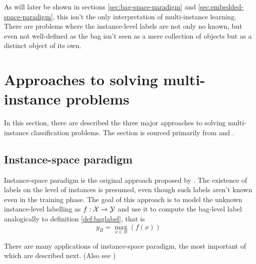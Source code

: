 As will later be shown in sections \ref{sec:bag-space-paradigm} and \ref{sec:embedded-space-paradigm}, this isn't the only interpretation of multi-instance learning. There are problems where the instance-level labels are not only no known, but even not well-defined as the bag isn't seen as a mere collection of objects but as a distinct object of its own.

\section{Approaches to solving multi-instance problems}
In this section, there are described the three major approaches to solving multi-instance classification problems. The section is sourced primarily from \cite{pevny_using_2017} and \cite{pevny_discriminative_2016}.

\subsection{Instance-space paradigm}
Instance-space paradigm is the original approach proposed by \cite{dietterich_solving_1997}. The existence of labels on the level of instances is presumed, even though such labels aren't known even in the training phase. The goal of this approach is to model the unknown instance-level labelling as \( f : \mathcal{X} \to \mathcal{Y} \) and use it to compute the bag-level label analogically to definition \ref{def:baglabel}, that is
\[ y_B = \max_{x \in B } \left( f \left( x \right) \right) \]

There are many applications of instance-space paradigm, the most important of which are described next. (Also see \cite{andrews_support_2003} \cite{zhang_multiple_2006})

